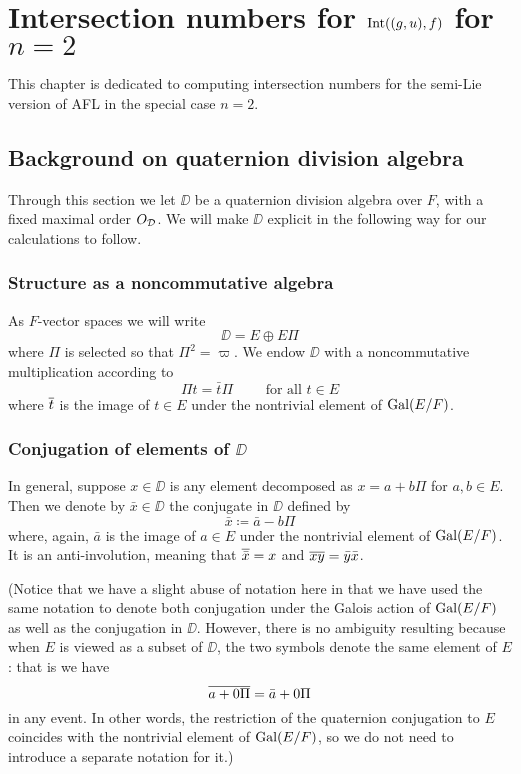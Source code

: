 \chapter{Intersection numbers for $\operatorname{Int}((g,u), f)$ for $n = 2$}
\label{ch:jiao}
This chapter is dedicated to computing intersection numbers
for the semi-Lie version of AFL in the special case $n = 2$.

\section{Background on quaternion division algebra}
Through this section we let $\DD$ be a quaternion division algebra over $F$,
with a fixed maximal order $O_\mathcal D$.
We will make $\DD$ explicit in the following way for our calculations to follow.

\subsection{Structure as a noncommutative algebra}
As $F$-vector spaces we will write
\[ \DD = E \oplus E \Pi \]
where $\Pi$ is selected so that $\Pi^2 = \varpi$.
We endow $\DD$ with a noncommutative multiplication according to
\[ \Pi t = \bar t \Pi \qquad \text{ for all } t \in E \]
where $\overline{t}$ is the image of $t \in E$ under the nontrivial element of $\operatorname{Gal}(E/F)$.

\subsection{Conjugation of elements of $\DD$}
In general, suppose $x \in \DD$ is any element
decomposed as $x = a + b \Pi$ for $a,b \in E$.
Then we denote by $\bar x \in \DD$ the conjugate in $\DD$ defined by
\[ \bar x \coloneqq \bar a - b \Pi \]
where, again, $\bar a$ is the image of $a \in E$ under the nontrivial element of $\operatorname{Gal}(E/F)$.
It is an anti-involution, meaning that $\overline{\bar x} = x$ and $\overline{xy} = \bar y \bar x$.

(Notice that we have a slight abuse of notation here in that we have
used the same notation to denote both conjugation under the Galois action of $\operatorname{Gal}(E/F)$
as well as the conjugation in $\DD$.
However, there is no ambiguity resulting because when $E$ is viewed as a subset of $\DD$,
the two symbols denote the same element of $E$:
that is we have
\[ \overline{a + 0 \Pi} = \bar{a} + 0 \Pi \]
in any event.
In other words, the restriction of the quaternion conjugation to $E$
coincides with the nontrivial element of $\operatorname{Gal}(E/F)$,
so we do not need to introduce a separate notation for it.)

